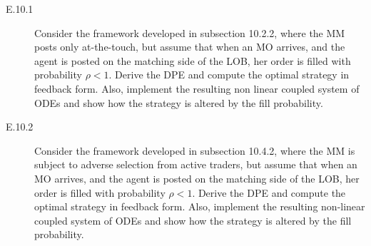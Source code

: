 \documentclass[11pt, a4paper]{book}
\begin{document}
	\begin{description}
		\item[E.10.1] Consider the framework developed in subsection 10.2.2, where the MM posts only at-the-touch, but assume that when an MO arrives, and the agent is posted on the matching side of the LOB, her order is filled with probability $\rho < 1$. Derive the DPE and compute the optimal strategy in feedback form. Also, implement the resulting non linear coupled system of ODEs and show how the strategy is altered by the fill probability.
		\item[E.10.2] Consider the framework developed in subsection 10.4.2, where the MM is subject to adverse selection from active traders, but assume that when an MO arrives, and the agent is posted on the matching side of the LOB, her order is filled with probability $\rho < 1$. Derive the DPE and compute the optimal strategy in feedback form. Also, implement the resulting non-linear coupled system of ODEs and show how the strategy is altered by the fill probability.
	\end{description}
	
\end{document}
